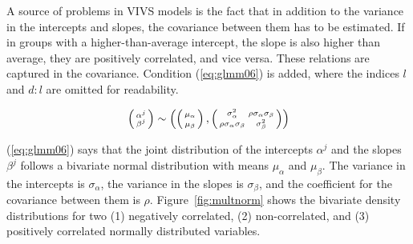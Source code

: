 A source of problems in VIVS models is the fact that in addition to the variance in the intercepts and slopes, the covariance between them has to be estimated.
If in groups with a higher-than-average intercept, the slope is also higher than average, they are positively correlated, and vice versa.
These relations are captured in the covariance.
Condition (\ref{eq:glmm06}) is added, where the indices $l$ and $d:l$ are omitted for readability.

\begin{equation} 
  \left( \begin{smallmatrix} \alpha^j \\ \beta^j \end{smallmatrix}\right) \sim
    \left(
    \left( \begin{smallmatrix} \mu_{\alpha}\vphantom{\beta^j} \\ \mu_{\beta}\vphantom{\beta^j} \end{smallmatrix} \right), 
      \left( \begin{smallmatrix} \sigma_{\alpha}^2 & \rho\sigma_{\alpha}\sigma_{\beta} \\
	\rho\sigma_{\alpha}\sigma_{\beta} & \sigma_{\beta}^2 \end{smallmatrix} \right)
    \right)
  \label{eq:glmm06}
\end{equation}

(\ref{eq:glmm06}) says that the joint distribution of the intercepts $\alpha^j$ and the slopes $\beta^j$ follows a bivariate normal distribution with means $\mu_{\alpha}$ and $\mu_{\beta}$.
The variance in the intercepts is $\sigma_{\alpha}$, the variance in the slopes is $\sigma_{\beta}$, and the coefficient for the covariance between them is $\rho$.
Figure~\ref{fig:multnorm} shows the bivariate density distributions for two (1) negatively correlated, (2) non-correlated, and (3) positively correlated normally distributed variables.

